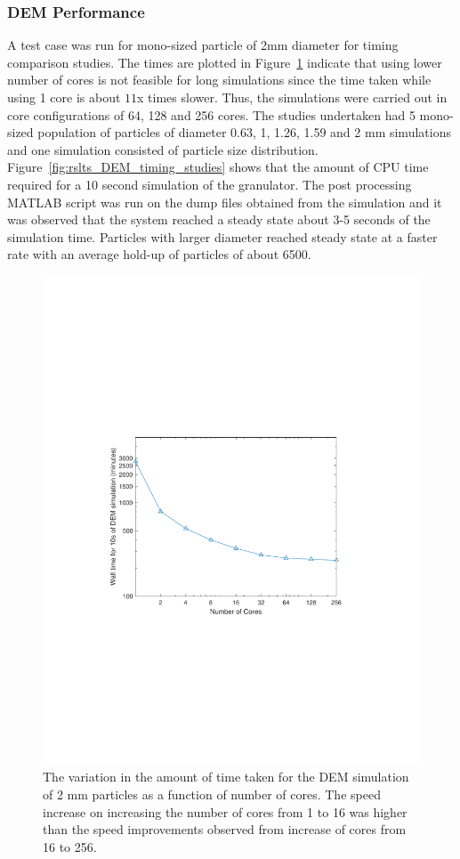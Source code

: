 \documentclass[preprint,11pt,authoryear]{elsarticle}
\begin{document}
\subsubsection{DEM Performance}
A test case was run for mono-sized particle of 2mm diameter for timing comparison studies. The 
times are plotted in Figure~\ref{fig:rslts_DEM_2mm_timing} indicate that using lower number of cores is 
not feasible for long simulations since the time taken while using 1 core is about $11$x times slower.
Thus, the simulations were carried out in core configurations of 64, 128 and 256 cores. The studies 
undertaken had 5 mono-sized population of particles of diameter 0.63, 1, 1.26, 1.59 and 2 mm 
simulations and one simulation consisted of particle size distribution. Figure~\ref{fig:rslts_DEM_timing_studies} shows that the amount of CPU time required for a 10 second 
simulation of the granulator. The post processing MATLAB script was run on the dump files obtained 
from the simulation and it was observed that the system reached a steady state about 3-5 seconds of 
the simulation time. Particles with larger diameter reached steady state at a faster rate with an average 
hold-up of particles of about 6500. 
\begin{figure}
\centering
\includegraphics[scale=0.75]{rslsts_2mm_timing_mtlb.pdf}
\caption{The variation in the amount of time taken for the DEM simulation of 2 mm particles as a function of number of cores. The 
speed increase on increasing the number of cores from 1 to 16 was higher than the speed improvements observed from increase of cores 
from 16 to 256.}
\label{fig:rslts_DEM_2mm_timing}
\end{figure}	
\end{document}
